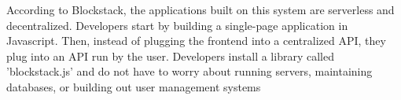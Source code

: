 According to Blockstack, the applications built on this system are serverless and decentralized. Developers start by building a single-page application in Javascript. Then, instead of plugging the frontend into a centralized API, they plug into an API run by the user. Developers install a library called ’blockstack.js’ and do not have to worry about running servers, maintaining databases, or building out user management systems \cite{BlockStackMainPage}
%
%
%
%
%
